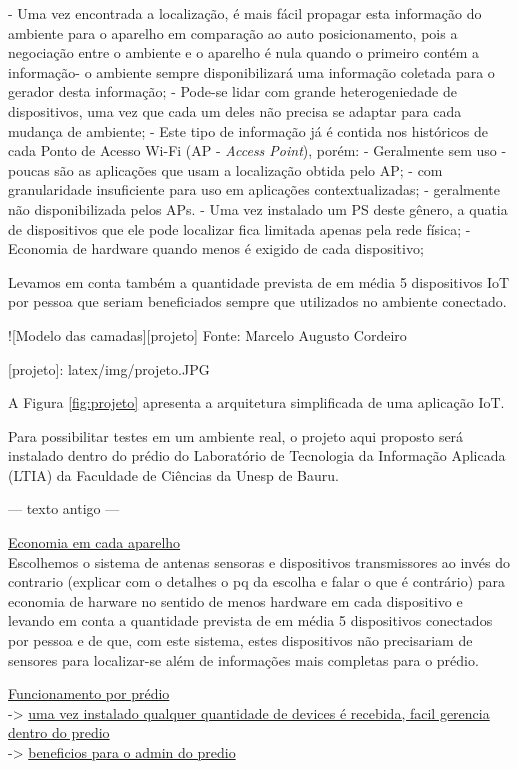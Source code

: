 \documentclass[
	12pt,				%
	openright,			%
	oneside,			%
	a4paper,			%
	chapter=TITLE,		%
	english,			%
	french,				%
	spanish,			%
	brazil				%
	]{abntex2}
\begin{document}
{- Uma vez encontrada a localização, é mais fácil propagar esta informação do
ambiente para o aparelho em comparação ao auto posicionamento, pois a negociação
entre o ambiente e o aparelho é nula quando o primeiro contém a informação- o
ambiente sempre disponibilizará uma informação coletada para o gerador desta
informação;
- Pode-se lidar com grande heterogeniedade de dispositivos, uma vez
que cada um deles não precisa se adaptar para cada mudança de ambiente;
- Este tipo de informação já é contida nos históricos de cada Ponto de Acesso
 Wi-Fi (AP - \textit{Access Point}), porém:
	- Geralmente sem uso - poucas são as aplicações que usam a localização
	obtida pelo AP;
	- com granularidade insuficiente para uso em aplicações contextualizadas;
	- geralmente não disponibilizada pelos APs.
- Uma vez instalado um PS deste gênero, a quatia de dispositivos que ele pode
localizar fica limitada apenas pela rede física;
- Economia de hardware quando menos é exigido de cada dispositivo;

Levamos em conta também a quantidade prevista de em média 5 dispositivos IoT
por pessoa que seriam beneficiados sempre que utilizados no ambiente conectado.

![Modelo das camadas][projeto]
Fonte: Marcelo Augusto Cordeiro

[projeto]: latex/img/projeto.JPG

A Figura \ref{fig:projeto} apresenta a arquitetura simplificada de uma aplicação
IoT.

Para possibilitar testes em um ambiente real, o projeto aqui proposto será
instalado dentro do prédio do Laboratório de Tecnologia da Informação Aplicada
(LTIA) da Faculdade de Ciências da Unesp de Bauru.


--- texto antigo ---

\underline{Economia em cada aparelho}\\

Escolhemos o sistema de antenas sensoras e dispositivos transmissores ao invés
do contrario (explicar com o detalhes o pq da escolha e falar o que é contrário)
para economia de harware no sentido de menos hardware em cada dispositivo e
levando em conta  a quantidade prevista de em média 5 dispositivos conectados
por pessoa e de que, com este sistema, estes dispositivos não precisariam de
sensores para localizar-se além de informações mais completas para o prédio.

\underline{Funcionamento por prédio} \\
 -> \underline{uma vez instalado qualquer quantidade de
devices é recebida, facil gerencia dentro do predio}\\
 -> \underline {beneficios para o admin do predio}\\


}
\end{document}
